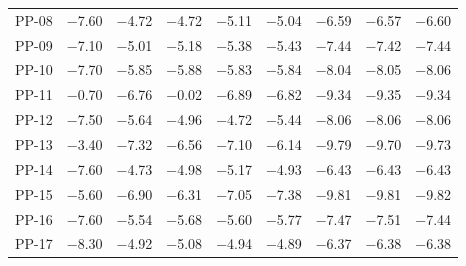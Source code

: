 \begin{table}[ht!]
\begin{tabular}{@{}lrrrrrrrr@{}}
PP-08 & \num{-7.60} & \num{-4.72} & \num{-4.72} & \num{-5.11} & \num{-5.04} & \num{-6.59} & \num{-6.57} & \num{-6.60} \\
PP-09 & \num{-7.10} & \num{-5.01} & \num{-5.18} & \num{-5.38} & \num{-5.43} & \num{-7.44} & \num{-7.42} & \num{-7.44} \\
PP-10 & \num{-7.70} & \num{-5.85} & \num{-5.88} & \num{-5.83} & \num{-5.84} & \num{-8.04} & \num{-8.05} & \num{-8.06} \\
PP-11 & \num{-0.70} & \num{-6.76} & \num{-0.02} & \num{-6.89} & \num{-6.82} & \num{-9.34} & \num{-9.35} & \num{-9.34} \\
PP-12 & \num{-7.50} & \num{-5.64} & \num{-4.96} & \num{-4.72} & \num{-5.44} & \num{-8.06} & \num{-8.06} & \num{-8.06} \\
PP-13 & \num{-3.40} & \num{-7.32} & \num{-6.56} & \num{-7.10} & \num{-6.14} & \num{-9.79} & \num{-9.70} & \num{-9.73} \\
PP-14 & \num{-7.60} & \num{-4.73} & \num{-4.98} & \num{-5.17} & \num{-4.93} & \num{-6.43} & \num{-6.43} & \num{-6.43} \\
PP-15 & \num{-5.60} & \num{-6.90} & \num{-6.31} & \num{-7.05} & \num{-7.38} & \num{-9.81} & \num{-9.81} & \num{-9.82} \\
PP-16 & \num{-7.60} & \num{-5.54} & \num{-5.68} & \num{-5.60} & \num{-5.77} & \num{-7.47} & \num{-7.51} & \num{-7.44} \\
PP-17 & \num{-8.30} & \num{-4.92} & \num{-5.08} & \num{-4.94} & \num{-4.89} & \num{-6.37} & \num{-6.38} & \num{-6.38} \\
\bottomrule
\end{tabular}
\end{table}

